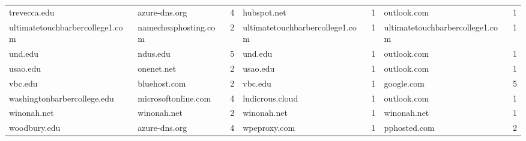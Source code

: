\begin{tabular}{l l r l r l r}
trevecca.edu & azure-dns.org & 4 & hubspot.net & 1 & outlook.com & 1 \\
ultimatetouchbarbercollege1.com & namecheaphosting.com & 2 & ultimatetouchbarbercollege1.com & 1 & ultimatetouchbarbercollege1.com & 1 \\
und.edu & ndus.edu & 5 & und.edu & 1 & outlook.com & 1 \\
usao.edu & onenet.net & 2 & usao.edu & 1 & outlook.com & 1 \\
vbc.edu & bluehost.com & 2 & vbc.edu & 1 & google.com & 5 \\
washingtonbarbercollege.edu & microsoftonline.com & 4 & ludicrous.cloud & 1 & outlook.com & 1 \\
winonah.net & winonah.net & 2 & winonah.net & 1 & winonah.net & 1 \\
woodbury.edu & azure-dns.org & 4 & wpeproxy.com & 1 & pphosted.com & 2 \\
\hline
\end{tabular}
